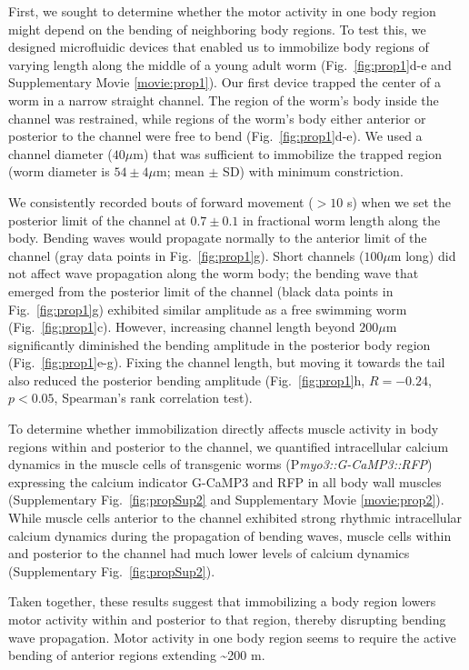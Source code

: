 First, we sought to determine whether the motor activity in one body region might depend on the 
bending of neighboring body regions. To test this, we designed microfluidic devices that enabled 
us to immobilize body regions of varying length along the middle of a young adult worm (Fig.~\ref{fig:prop1}d-e and Supplementary Movie \ref{movie:prop1}). Our first device trapped the center of a worm in a narrow 
straight channel. The region of the worm's body inside the channel was restrained, while  regions of the worm's body either anterior or 
posterior to the channel were free to bend (Fig.~\ref{fig:prop1}d-e). We used a channel diameter ($40 \mu$m) that was sufficient to 
immobilize the trapped region (worm diameter is $54 \pm 4 \mu$m; mean $\pm$ SD) with minimum 
constriction.  

We consistently recorded bouts of forward movement ($> 10$ s) when we set the posterior limit of 
the channel at $0.7 \pm 0.1$ in fractional worm length along the body. Bending waves would 
propagate normally to the anterior limit of the channel (gray data points in Fig.~\ref{fig:prop1}g). Short 
channels ($100 \mu$m long) did not affect wave propagation along the worm body; the bending wave 
that emerged from the posterior limit of the channel (black data points in Fig.~\ref{fig:prop1}g) exhibited 
similar amplitude as a free swimming worm (Fig.~\ref{fig:prop1}c). However, increasing channel length 
beyond $200 \mu$m significantly diminished the bending amplitude in the posterior body region (Fig.~\ref{fig:prop1}e-g). Fixing the channel length, but moving it towards the tail also reduced the posterior 
bending amplitude (Fig.~\ref{fig:prop1}h, $R = -0.24$, $p < 0.05$, Spearman’s rank correlation test).

To determine whether immobilization directly affects muscle activity in body regions within and 
posterior to the channel, we quantified intracellular calcium dynamics in the muscle cells of 
transgenic worms (P\textit{myo3::G-CaMP3::RFP}) expressing the calcium indicator G-CaMP3 \citep{tian_imaging_2009} and RFP in all body wall muscles (Supplementary Fig.~\ref{fig:propSup2} and Supplementary Movie \ref{movie:prop2}). While 
muscle cells anterior to the channel exhibited strong rhythmic intracellular calcium dynamics 
during the propagation of bending waves, muscle cells within and posterior to the channel had 
much lower levels of calcium dynamics (Supplementary Fig.~\ref{fig:propSup2}).

Taken together, these results suggest that immobilizing a body region lowers motor activity 
within and posterior to that region, thereby disrupting bending wave propagation. Motor activity 
in one body region seems to require the active bending of anterior regions extending \textasciitilde200 \textmu m.

